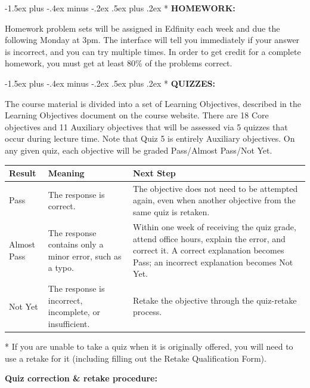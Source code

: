 \documentclass[11pt]{article}
\makeatletter
\renewcommand\section{\@startsection{section}{1}{0pt}%
  {-1.5ex plus -.4ex minus -.2ex}%
  {.5ex plus .2ex}%
  {\normalfont\Large\bfseries}}
\makeatother
\begin{document}
\section*{}
\textbf{HOMEWORK:}

Homework problem sets will be assigned in Edfinity each week and due the following Monday at 3pm. The interface will tell you immediately if your answer is incorrect, and you can try multiple times. In order to get credit for a complete homework, you must get at least 80\% of the problems correct.

\section*{}
\textbf{QUIZZES:}

The course material is divided into a set of Learning Objectives, described in the Learning Objectives document on the course website. There are 18 Core objectives and 11 Auxiliary objectives that will be assessed via 5 quizzes that occur during lecture time. Note that Quiz 5 is entirely Auxiliary objectives. On any given quiz, each objective will be graded Pass/Almost Pass/Not Yet.

\begin{center}
\small
\setlength{\tabcolsep}{4pt}
\begin{tabularx}{\textwidth}{lYY}
\toprule
\textbf{Result} & \textbf{Meaning} & \textbf{Next Step} \\
\midrule
Pass & The response is correct. & The objective does not need to be attempted again, even when another objective from the same quiz is retaken. \\
Almost Pass & The response contains only a minor error, such as a typo. & Within one week of receiving the quiz grade, attend office hours, explain the error, and correct it. A correct explanation becomes Pass; an incorrect explanation becomes Not Yet. \\
Not Yet & The response is incorrect, incomplete, or insufficient. & Retake the objective through the quiz-retake process. \\
\bottomrule
\end{tabularx}
\end{center}

* If you are unable to take a quiz when it is originally offered, you will need to use a retake for it (including filling out the Retake Qualification Form).

\textbf{Quiz correction \& retake procedure:}
\end{document}
